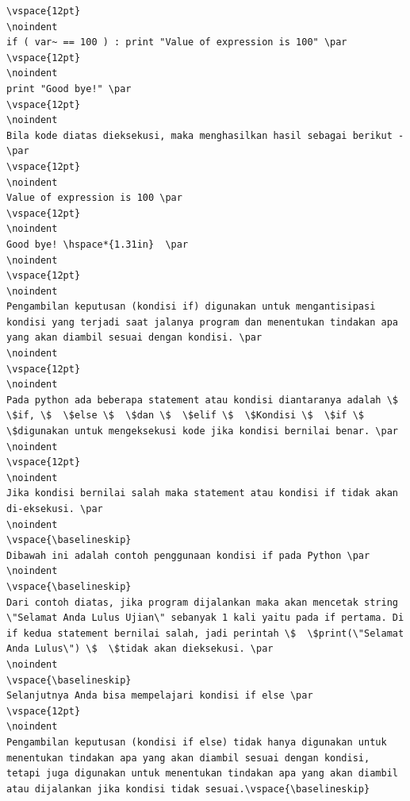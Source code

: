 \begin{verbatim}
\vspace{12pt}
\noindent 
if ( var~ == 100 ) : print "Value of expression is 100" \par
\vspace{12pt}
\noindent 
print "Good bye!" \par
\vspace{12pt}
\noindent 
Bila kode diatas dieksekusi, maka menghasilkan hasil sebagai berikut - \par
\vspace{12pt}
\noindent 
Value of expression is 100 \par
\vspace{12pt}
\noindent 
Good bye! \hspace*{1.31in}  \par
\noindent 
\vspace{12pt}
\noindent 
Pengambilan keputusan (kondisi if) digunakan untuk mengantisipasi kondisi yang terjadi saat jalanya program dan menentukan tindakan apa yang akan diambil sesuai dengan kondisi. \par
\noindent 
\vspace{12pt}
\noindent 
Pada python ada beberapa statement atau kondisi diantaranya adalah \$  \$if, \$  \$else \$  \$dan \$  \$elif \$  \$Kondisi \$  \$if \$  \$digunakan untuk mengeksekusi kode jika kondisi bernilai benar. \par
\noindent 
\vspace{12pt}
\noindent 
Jika kondisi bernilai salah maka statement atau kondisi if tidak akan di-eksekusi. \par
\noindent 
\vspace{\baselineskip}
Dibawah ini adalah contoh penggunaan kondisi if pada Python \par
\noindent 
\vspace{\baselineskip}
Dari contoh diatas, jika program dijalankan maka akan mencetak string \"Selamat Anda Lulus Ujian\" sebanyak 1 kali yaitu pada if pertama. Di if kedua statement bernilai salah, jadi perintah \$  \$print(\"Selamat Anda Lulus\") \$  \$tidak akan dieksekusi. \par
\noindent 
\vspace{\baselineskip}
Selanjutnya Anda bisa mempelajari kondisi if else \par
\vspace{12pt}
\noindent 
Pengambilan keputusan (kondisi if else) tidak hanya digunakan untuk menentukan tindakan apa yang akan diambil sesuai dengan kondisi, tetapi juga digunakan untuk menentukan tindakan apa yang akan diambil atau dijalankan jika kondisi tidak sesuai.\vspace{\baselineskip}

\end{verbatim}
